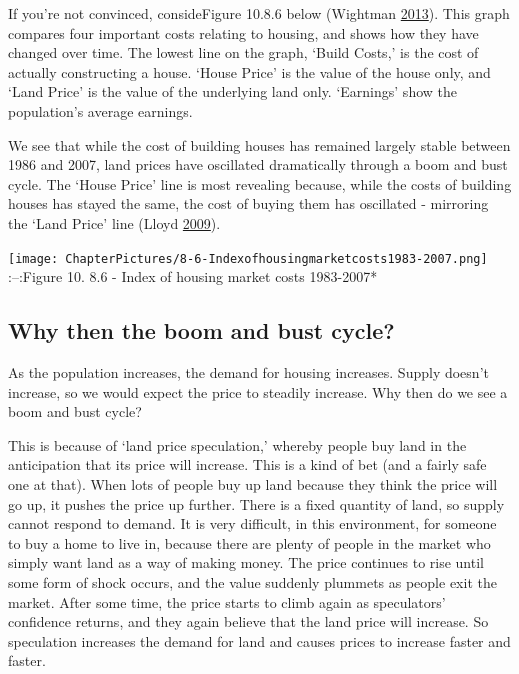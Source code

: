 \documentclass[]{tufte-handout}
\begin{document}
If you're not convinced, consideFigure 10.8.6 below (Wightman
\protect\hyperlink{ref-Wightman2013}{2013}). This graph compares four
important costs relating to housing, and shows how they have changed
over time. The lowest line on the graph, `Build Costs,' is the cost of
actually constructing a house. `House Price' is the value of the house
only, and `Land Price' is the value of the underlying land only.
`Earnings' show the population's average earnings.

We see that while the cost of building houses has remained largely
stable between 1986 and 2007, land prices have oscillated dramatically
through a boom and bust cycle. The `House Price' line is most revealing
because, while the costs of building houses has stayed the same, the
cost of buying them has oscillated - mirroring the `Land Price' line
(Lloyd \protect\hyperlink{ref-Lloyd2009}{2009}).

\textbar{}\texttt{[image: ChapterPictures/8-6-Indexofhousingmarketcosts1983-2007.png]}\textbar{}
\textbar{}:--:\textbar{}Figure 10. 8.6 - Index of housing market costs
1983-2007*\textbar{}

\hypertarget{why-then-the-boom-and-bust-cycle}{%
\subsection{Why then the boom and bust
cycle?}\label{why-then-the-boom-and-bust-cycle}}

As the population increases, the demand for housing increases. Supply
doesn't increase, so we would expect the price to steadily increase. Why
then do we see a boom and bust cycle?

This is because of `land price speculation,' whereby people buy land in
the anticipation that its price will increase. This is a kind of bet
(and a fairly safe one at that). When lots of people buy up land because
they think the price will go up, it pushes the price up further. There
is a fixed quantity of land, so supply cannot respond to demand. It is
very difficult, in this environment, for someone to buy a home to live
in, because there are plenty of people in the market who simply want
land as a way of making money. The price continues to rise until some
form of shock occurs, and the value suddenly plummets as people exit the
market. After some time, the price starts to climb again as speculators'
confidence returns, and they again believe that the land price will
increase. So speculation increases the demand for land and causes prices
to increase faster and faster.
\end{document}
